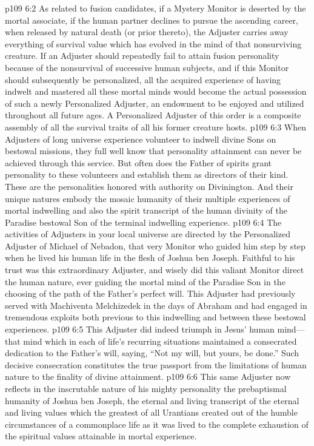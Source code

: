 \vs p109 6:2 As related to fusion candidates, if a Mystery Monitor is deserted by the mortal associate, if the human partner declines to pursue the ascending career, when released by natural death (or prior thereto), the Adjuster carries away everything of survival value which has evolved in the mind of that nonsurviving creature. If an Adjuster should repeatedly fail to attain fusion personality because of the nonsurvival of successive human subjects, and if this Monitor should subsequently be personalized, all the acquired experience of having indwelt and mastered all these mortal minds would become the actual possession of such a newly Personalized Adjuster, an endowment to be enjoyed and utilized throughout all future ages. A Personalized Adjuster of this order is a composite assembly of all the survival traits of all his former creature hosts.
\vs p109 6:3 When Adjusters of long universe experience volunteer to indwell divine Sons on bestowal missions, they full well know that personality attainment can never be achieved through this service. But often does the Father of spirits grant personality to these volunteers and establish them as directors of their kind. These are the personalities honored with authority on Divinington. And their unique natures embody the mosaic humanity of their multiple experiences of mortal indwelling and also the spirit transcript of the human divinity of the Paradise bestowal Son of the terminal indwelling experience.
\vs p109 6:4 The activities of Adjusters in your local universe are directed by the Personalized Adjuster of Michael of Nebadon, that very Monitor who guided him step by step when he lived his human life in the flesh of Joshua ben Joseph. Faithful to his trust was this extraordinary Adjuster, and wisely did this valiant Monitor direct the human nature, ever guiding the mortal mind of the Paradise Son in the choosing of the path of the Father’s perfect will. This Adjuster had previously served with Machiventa Melchizedek in the days of Abraham and had engaged in tremendous exploits both previous to this indwelling and between these bestowal experiences.
\vs p109 6:5 This Adjuster did indeed triumph in Jesus’ human mind---that mind which in each of life’s recurring situations maintained a consecrated dedication to the Father’s will, saying, “Not my will, but yours, be done.” Such decisive consecration constitutes the true passport from the limitations of human nature to the finality of divine attainment.
\vs p109 6:6 This same Adjuster now reflects in the inscrutable nature of his mighty personality the prebaptismal humanity of Joshua ben Joseph, the eternal and living transcript of the eternal and living values which the greatest of all Urantians created out of the humble circumstances of a commonplace life as it was lived to the complete exhaustion of the spiritual values attainable in mortal experience.
